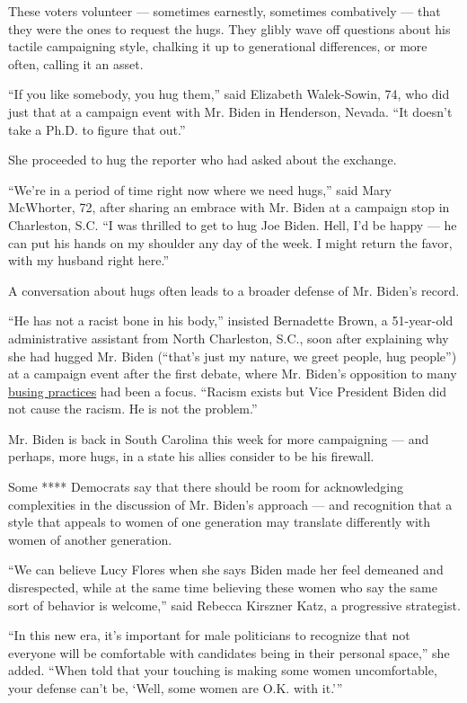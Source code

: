 These voters volunteer --- sometimes earnestly, sometimes combatively
--- that they were the ones to request the hugs. They glibly wave off
questions about his tactile campaigning style, chalking it up to
generational differences, or more often, calling it an asset.

``If you like somebody, you hug them,'' said Elizabeth Walek-Sowin, 74,
who did just that at a campaign event with Mr. Biden in Henderson,
Nevada. ``It doesn't take a Ph.D. to figure that out.''

She proceeded to hug the reporter who had asked about the exchange.

``We're in a period of time right now where we need hugs,'' said Mary
McWhorter, 72, after sharing an embrace with Mr. Biden at a campaign
stop in Charleston, S.C. ``I was thrilled to get to hug Joe Biden. Hell,
I'd be happy --- he can put his hands on my shoulder any day of the
week. I might return the favor, with my husband right here.''

A conversation about hugs often leads to a broader defense of Mr.
Biden's record.

``He has not a racist bone in his body,'' insisted Bernadette Brown, a
51-year-old administrative assistant from North Charleston, S.C., soon
after explaining why she had hugged Mr. Biden (``that's just my nature,
we greet people, hug people'') at a campaign event after the first
debate, where Mr. Biden's opposition to many
\href{https://www.nytimes.com/2019/07/31/us/politics/kamala-harris-biden-busing.html}{busing
practices} had been a focus. ``Racism exists but Vice President Biden
did not cause the racism. He is not the problem.''

Mr. Biden is back in South Carolina this week for more campaigning ---
and perhaps, more hugs, in a state his allies consider to be his
firewall.

Some **** Democrats say that there should be room for acknowledging
complexities in the discussion of Mr. Biden's approach --- and
recognition that a style that appeals to women of one generation may
translate differently with women of another generation.

``We can believe Lucy Flores when she says Biden made her feel demeaned
and disrespected, while at the same time believing these women who say
the same sort of behavior is welcome,'' said Rebecca Kirszner Katz, a
progressive strategist.

``In this new era, it's important for male politicians to recognize that
not everyone will be comfortable with candidates being in their personal
space,'' she added. ``When told that your touching is making some women
uncomfortable, your defense can't be, `Well, some women are O.K. with
it.'''

